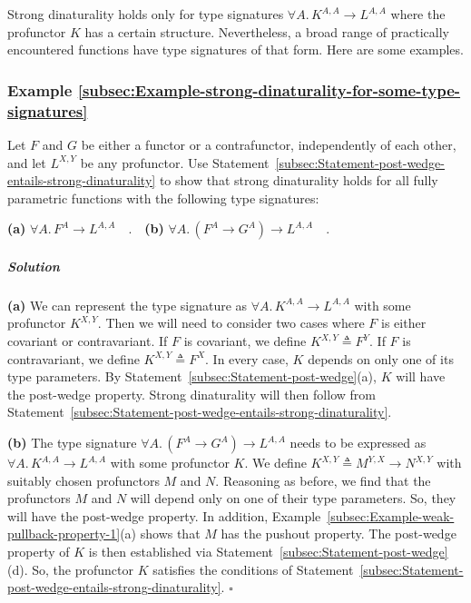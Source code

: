 Strong dinaturality holds only for type signatures $\forall A.\,K^{A,A}\rightarrow L^{A,A}$
where the profunctor $K$ has a certain structure. Nevertheless, a
broad range of practically encountered functions have type signatures
of that form. Here are some examples.

\subsubsection{Example \label{subsec:Example-strong-dinaturality-for-some-type-signatures}\ref{subsec:Example-strong-dinaturality-for-some-type-signatures}}

Let $F$ and $G$ be either a functor or a contrafunctor, independently
of each other, and let $L^{X,Y}$ be any profunctor. Use Statement~\ref{subsec:Statement-post-wedge-entails-strong-dinaturality}
to show that strong dinaturality holds for all fully parametric functions
with the following type signatures:

\textbf{(a)} $\forall A.\,F^{A}\rightarrow L^{A,A}\quad.$\textbf{$\quad$(b)}
$\forall A.\,(F^{A}\rightarrow G^{A})\rightarrow L^{A,A}\quad.$

\subparagraph{Solution}

\textbf{(a)} We can represent the type signature as $\forall A.\,K^{A,A}\rightarrow L^{A,A}$
with some profunctor $K^{X,Y}$. Then we will need to consider two
cases where $F$ is either covariant or contravariant. If $F$ is
covariant, we define $K^{X,Y}\triangleq F^{Y}$. If $F$ is contravariant,
we define $K^{X,Y}\triangleq F^{X}$. In every case, $K$ depends
on only one of its type parameters. By Statement~\ref{subsec:Statement-post-wedge}(a),
$K$ will have the post-wedge property. Strong dinaturality will then
follow from Statement~\ref{subsec:Statement-post-wedge-entails-strong-dinaturality}.

\textbf{(b)} The type signature $\forall A.\,(F^{A}\rightarrow G^{A})\rightarrow L^{A,A}$
needs to be expressed as $\forall A.\,K^{A,A}\rightarrow L^{A,A}$
with some profunctor $K$. We define $K^{X,Y}\triangleq M^{Y,X}\rightarrow N^{X,Y}$
with suitably chosen profunctors $M$ and $N$. Reasoning as before,
we find that the profunctors $M$ and $N$ will depend only on one
of their type parameters. So, they will have the post-wedge property.
In addition, Example~\ref{subsec:Example-weak-pullback-property-1}(a)
shows that $M$ has the pushout property. The post-wedge property
of $K$ is then established via Statement~\ref{subsec:Statement-post-wedge}(d).
So, the profunctor $K$ satisfies the conditions of Statement~\ref{subsec:Statement-post-wedge-entails-strong-dinaturality}.
$\square$

